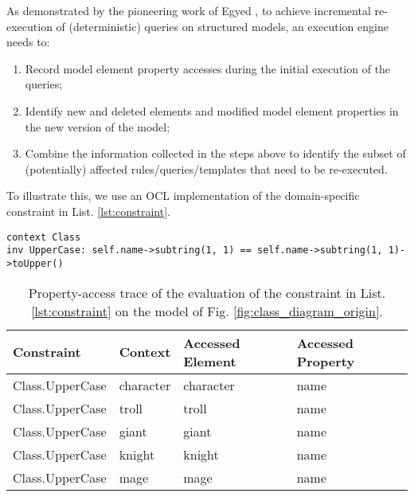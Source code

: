 As demonstrated by the pioneering work of Egyed \cite{egyed2011automatically}, 
to achieve incremental re-execution of (deterministic) queries on 
structured models, an execution engine needs to:

\begin{enumerate}
    \item Record model element property accesses during the initial execution of the queries;
    \item Identify new and deleted elements and modified model element properties in the new version of the model;
    \item Combine the information collected in the steps above to identify the subset of (potentially) affected rules/queries/templates that need to be re-executed.
\end{enumerate}

To illustrate this, we use an OCL implementation of the domain-specific constraint in List. \ref{lst:constraint}.

\begin{lstlisting}[style=ocl,caption={OCL constraint requiring that a class should start with an uppercase.},label=lst:constraint]
context Class
inv UpperCase: self.name->subtring(1, 1) == self.name->subtring(1, 1)->toUpper()
\end{lstlisting}

\begin{table}[ht]
    \centering
    \caption{Property-access trace of the evaluation of the constraint in List. \ref{lst:constraint} on the model of Fig. \ref{fig:class_diagram_origin}.}
    \begin{tabular}{p{4cm} p{2.1cm} p{2cm} p{2.1cm}}
        \hline 
        \textbf{Constraint} & \textbf{Context} & \textbf{Accessed Element} & \textbf{Accessed Property} \\ 
        \hline 
        \textsf{Class.UpperCase}  & \textsf{character} & \textsf{character} & \textsf{name} \\ 
        \textsf{Class.UpperCase}  & \textsf{troll} & \textsf{troll} & \textsf{name} \\ 
        \textsf{Class.UpperCase}  & \textsf{giant} & \textsf{giant} & \textsf{name} \\ 
        \textsf{Class.UpperCase}  & \textsf{knight} & \textsf{knight} & \textsf{name} \\
        \textsf{Class.UpperCase}  & \textsf{mage} & \textsf{mage} & \textsf{name} \\
        \hline 
    \end{tabular} 
    \label{tab:property_access_trace}
\end{table}

